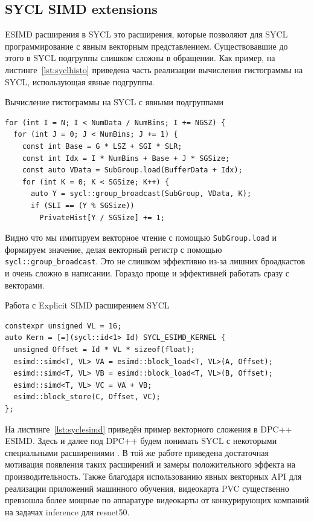 \subsection{SYCL SIMD extensions}\label{subsec:overview/vectorapi/dpcppesimd}

ESIMD расширения в SYCL это расширения, которые позволяют для SYCL программирование с явным векторным представлением. Существовавшие до этого в SYCL подгруппы слишком сложны в обращении. Как пример, на листинге~\cref{lst:syclhisto} приведена часть реализации вычисления гистограммы на SYCL, использующая явные подгруппы.

\begin{ListingEnv}[!h]
    \captiondelim{ } 
    \caption{Вычисление гистограммы на SYCL с явными подгруппами}\label{lst:syclhisto}
    \begin{lstlisting}[language={[ISO]C++}]
for (int I = N; I < NumData / NumBins; I += NGSZ) {
  for (int J = 0; J < NumBins; J += 1) {
    const int Base = G * LSZ + SGI * SLR;
    const int Idx = I * NumBins + Base + J * SGSize;
    const auto VData = SubGroup.load(BufferData + Idx);
    for (int K = 0; K < SGSize; K++) {
      auto Y = sycl::group_broadcast(SubGroup, VData, K);
      if (SLI == (Y % SGSize))
        PrivateHist[Y / SGSize] += 1;
    \end{lstlisting}
\end{ListingEnv}

Видно что мы имитируем векторное чтение с помощью \lstinline!SubGroup.load! и формируем значение, делая векторный регистр с помощью \lstinline!sycl::group_broadcast!. Это не слишком эффективно из-за лишних броадкастов и очень сложно в написании. Гораздо проще и эффективней работать сразу с векторами.

\begin{ListingEnv}[!h]
    \captiondelim{ } 
    \caption{Работа с Explicit SIMD расширением SYCL}\label{lst:syclesimd}
    \begin{lstlisting}[language={[ISO]C++}]
constexpr unsigned VL = 16;
auto Kern = [=](sycl::id<1> Id) SYCL_ESIMD_KERNEL {
  unsigned Offset = Id * VL * sizeof(float);
  esimd::simd<T, VL> VA = esimd::block_load<T, VL>(A, Offset);
  esimd::simd<T, VL> VB = esimd::block_load<T, VL>(B, Offset);
  esimd::simd<T, VL> VC = VA + VB;
  esimd::block_store(C, Offset, VC);
};
    \end{lstlisting}
\end{ListingEnv}

На листинге~\cref{lst:syclesimd} приведён пример векторного сложения в DPC++ ESIMD. Здесь и далее под DPC++ будем понимать SYCL с некоторыми специальными расширениями \cite{reinders2021dpc}. В той же работе приведена достаточная мотивация появления таких расширений и замеры положительного эффекта на производительность. Также благодаря использованию явных векторных API для реализации приложений машинного обучения, видеокарта PVC \cite{gomes2022ponte} существенно превзошла более мощные по аппаратуре видеокарты от конкурирующих компаний на задачах inference для resnet50.

